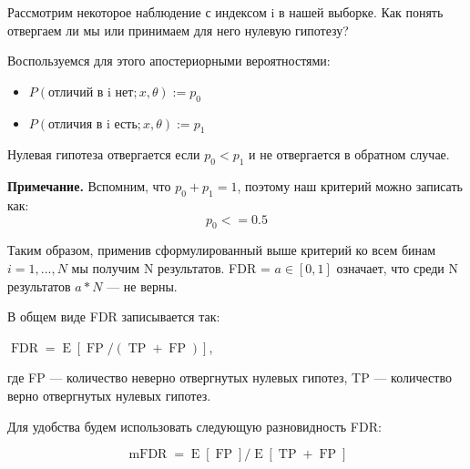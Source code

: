 \documentclass{matmex-diploma}
\begin{document}
Рассмотрим некоторое наблюдение с индексом i в нашей выборке. Как понять отвергаем ли мы или принимаем для него нулевую гипотезу? 

Воспользуемся для этого апостериорными вероятностями:

\begin{itemize}
  \item $P(\textrm{отличий в i нет}; x, \theta) := p_0$
  \item $P(\textrm{отличия в i есть};x, \theta) := p_1$
\end{itemize}

Нулевая гипотеза отвергается если $p_0 < p_1$ и не отвергается в обратном случае. 

\textbf{Примечание.} Вспомним, что $p_0 + p_1 = 1$, поэтому наш критерий можно записать как:
$$p_0 <= 0.5$$

Таким образом, применив сформулированный выше критерий ко всем бинам $i = 1,..., N$ мы получим N результатов. FDR = $a \in [0, 1]$ означает, что среди N результатов $a * N$ — не верны.

В общем виде FDR записывается так:

$\operatorname{FDR} = \operatorname{E}[\operatorname{FP} / (\operatorname{TP} + \operatorname{FP})]$,

где FP — количество неверно отвергнутых нулевых гипотез, TP — количество верно отвергнутых нулевых гипотез.

Для удобства будем использовать следующую разновидность FDR:

\begin{equation}\operatorname{mFDR} = \operatorname{E}[\operatorname{FP}] / \operatorname{E}[\operatorname{TP} + \operatorname{FP}]\end{equation}





\end{document}
